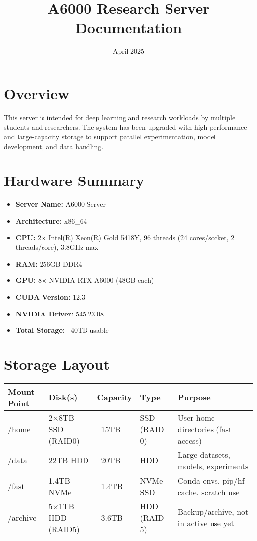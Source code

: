 \documentclass{article}
\title{A6000 Research Server Documentation}
\date{April 2025}
\begin{document}
\maketitle

\section*{Overview}
This server is intended for deep learning and research workloads by multiple students and researchers. The system has been upgraded with high-performance and large-capacity storage to support parallel experimentation, model development, and data handling.

\section*{Hardware Summary}
\begin{itemize}
  \item \textbf{Server Name:} A6000 Server
  \item \textbf{Architecture:} x86\_64
  \item \textbf{CPU:} 2× Intel(R) Xeon(R) Gold 5418Y, 96 threads (24 cores/socket, 2 threads/core), 3.8GHz max
  \item \textbf{RAM:} 256GB DDR4
  \item \textbf{GPU:} 8× NVIDIA RTX A6000 (48GB each)
  \item \textbf{CUDA Version:} 12.3
  \item \textbf{NVIDIA Driver:} 545.23.08
  \item \textbf{Total Storage:} ~40TB usable
\end{itemize}

\section*{Storage Layout}
\begin{longtable}{|l|l|l|l|p{6cm}|}
\hline
\textbf{Mount Point} & \textbf{Disk(s)} & \textbf{Capacity} & \textbf{Type} & \textbf{Purpose} \\
\hline
/home & 2×8TB SSD (RAID0) & ~15TB & SSD (RAID 0) & User home directories (fast access) \\
/data & 22TB HDD & ~20TB & HDD & Large datasets, models, experiments \\
/fast & 1.4TB NVMe & ~1.4TB & NVMe SSD & Conda envs, pip/hf cache, scratch use \\
/archive & 5×1TB HDD (RAID5) & ~3.6TB & HDD (RAID 5) & Backup/archive, not in active use yet \\
\hline
\end{longtable}
\end{document}

